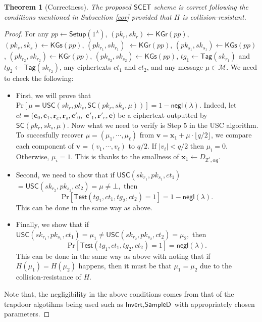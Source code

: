 \documentclass[a4paper,11pt,onecolumn]{elsarticle}
\def\Pr{\mathrm{Pr}}
\newtheorem{theorem}{Theorem}
\begin{document}
	
	\begin{theorem}[Correctness] \label{corrtheorem}
		The proposed $\mathsf{SCET}$ scheme is correct following the conditions mentioned in Subsection \ref{cor} provided that $H$ is collision-resistant.
	\end{theorem}
	\begin{proof}
			For any $pp \leftarrow \textsf{Setup}(1^{\lambda})$, $(pk_r, sk_r) \leftarrow \textsf{KGr} (pp)$, $(pk_s, sk_s) \leftarrow \textsf{KGs} (pp)$,  $(pk_{r_1}, sk_{r_1}) $ $ \leftarrow \textsf{KGr} (pp)$, $(pk_{s_1}, sk_{s_1}) \leftarrow \textsf{KGs} (pp)$, $(pk_{r_2}, sk_{r_2}) \leftarrow \textsf{KGr} (pp)$, $(pk_{s_2}, sk_{s_2}) \leftarrow \textsf{KGs} (pp)$, $tg_1 \leftarrow \textsf{Tag}(sk_{r_1})$ and $tg_2 \leftarrow \textsf{Tag}(sk_{r_2})$, any ciphertexts $ct_1$ and $ct_2$, and any message $\mu \in \mathcal{M}$. We need to check the following:
			\begin{itemize}
				\item First, we will prove that $\Pr[\mu=\textsf{USC}(sk_r, pk_s,\textsf{SC}( pk_r, sk_s,\mu))]=1-\textsf{negl}(\lambda).$ Indeed, let $ct=(\textbf{c}_0, \textbf{c}_1, \textbf{r}_e,\textbf{r}_s,\textbf{c}'_0,$ $ \textbf{c}'_1,\textbf{r}'_e,   \textbf{e})$ be a ciphertext outputted by $\textsf{SC}( pk_r, sk_s,\mu)$. Now what we need to verify is Step 5 in the \textsf{USC} algorithm. To succesfully recover $\mu=(\mu_1, \cdots, \mu_\ell)$ from $\textbf{v}=\textbf{x}_1+\mu \cdot \lfloor q/2\rfloor $, we compare each component of $\textbf{v}=(v_1, \cdots, v_\ell)$ to  $q/2$. If $|v_i|<q/2$ then $\mu_i=0$. Otherwise, $\mu_i=1$. This is thanks to the smallness of $\textbf{x}_1\leftarrow D_{\mathbb{Z}^{\ell}, \alpha q}$.
				\item Second, we need to show that if
				 $\textsf{USC}(sk_{r_1}, pk_{s_1},ct_1)$ $=\textsf{USC}(sk_{r_2}, pk_{s_2},ct_2)=\mu \neq \bot,$
				then $$\Pr[\textsf{Test}(tg_1,ct_1,tg_2,ct_2) =1]=1-\textsf{negl}(\lambda).$$ This can be done in the same way as above.
				\item Finally, we show that if
				$\textsf{USC}(sk_{r_1}, pk_{s_1},ct_1)=\mu_1 \neq \textsf{USC}(sk_{r_2}, pk_{s_2},ct_2)=\mu_2,$
				then $$\Pr[\textsf{Test}(tg_1,ct_1,tg_2,ct_2)=1]=\textsf{negl}(\lambda).$$
					This can be done in the same way as above with noting that if $H(\mu_1)=H(\mu_2)$ happens, then it must be that $\mu_1=\mu_2$ due to the collision-resistance of $H$.
			\end{itemize}
	Note that, the negligibility in the above conditions comes from that of the trapdoor algotihms being used such as $\textsf{Invert}, \textsf{SampleD}$ with appropriately chosen parameters.	
			
		
	\end{proof}
\end{document}
